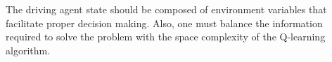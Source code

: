 \documentclass[12pt,letterpaper]{article}
\renewenvironment{itemize}{
  \begin{list}{}{
    \setlength{\leftmargin}{1.5em}
  }
}{
  \end{list}
}
\begin{document}
The driving agent state should be composed of environment variables that facilitate proper decision making.
Also, one must balance the information required to solve the problem with the space complexity of the Q-learning algorithm.

\end{document}
